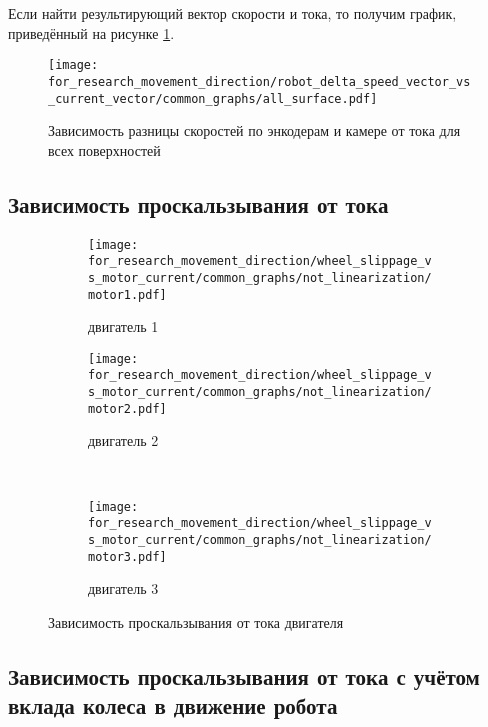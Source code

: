 Если найти результирующий вектор скорости и тока, то получим график, приведённый на рисунке \ref{fig:delta_robot_speed_vector_vs_current_vector}.

\begin{figure}[H]
    \centering
    \texttt{[image: for\_research\_movement\_direction/robot\_delta\_speed\_vector\_vs\_current\_vector/common\_graphs/all\_surface.pdf]}
    \caption{Зависимость разницы скоростей по энкодерам и камере от тока для всех поверхностей}
    \label{fig:delta_robot_speed_vector_vs_current_vector}
\end{figure}

\subsection{Зависимость проскальзывания от тока}

\begin{figure}[H]
    \centering
    \begin{subfigure}{0.49\textwidth}
        \centering
        \texttt{[image: for\_research\_movement\_direction/wheel\_slippage\_vs\_motor\_current/common\_graphs/not\_linearization/motor1.pdf]}
        \caption{двигатель 1}
    \end{subfigure}
    \hspace{0.005\textwidth}
    \begin{subfigure}{0.49\textwidth}
        \centering
        \texttt{[image: for\_research\_movement\_direction/wheel\_slippage\_vs\_motor\_current/common\_graphs/not\_linearization/motor2.pdf]}
        \caption{двигатель 2}
    \end{subfigure} \\
    \vspace{4pt}
    \centering
    \begin{subfigure}{0.49\textwidth}
        \centering
        \texttt{[image: for\_research\_movement\_direction/wheel\_slippage\_vs\_motor\_current/common\_graphs/not\_linearization/motor3.pdf]}
        \caption{двигатель 3}
    \end{subfigure}
    \caption{Зависимость проскальзывания от тока двигателя}
\end{figure}

\subsection{Зависимость проскальзывания от тока с учётом вклада колеса в движение робота}

